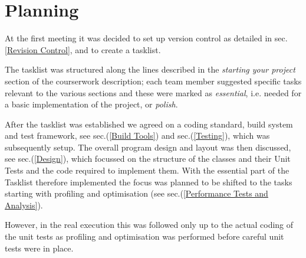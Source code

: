 \section{Planning}
\label{Planning}
At the first meeting it was decided to set up version control as detailed in sec.\ref{Revision Control}, and to create a tasklist.

The tasklist was structured along the lines described in the \textit{starting your project} section of the courserwork description; each team member suggested specific tasks relevant to the various sections and these were marked as \textit{essential}, i.e. needed for a basic implementation of the project, or \textit{polish}.

After the tasklist was established we agreed on a coding standard, build system and test framework, see sec.(\ref{Build Tools}) and sec.(\ref{Testing}), which was subsequently setup.
The overall program design and layout was then discussed, see sec.(\ref{Design}), which focussed on the structure of the classes and their Unit Tests and the code required to implement them.
With the essential part of the Tasklist therefore implemented the focus was planned to be shifted to the  tasks starting with profiling and optimisation (see sec.(\ref{Performance Tests and Analysis}).

However, in the real execution this was followed only up to the actual coding of the unit tests as profiling and optimisation was performed before careful unit tests were in place. 
